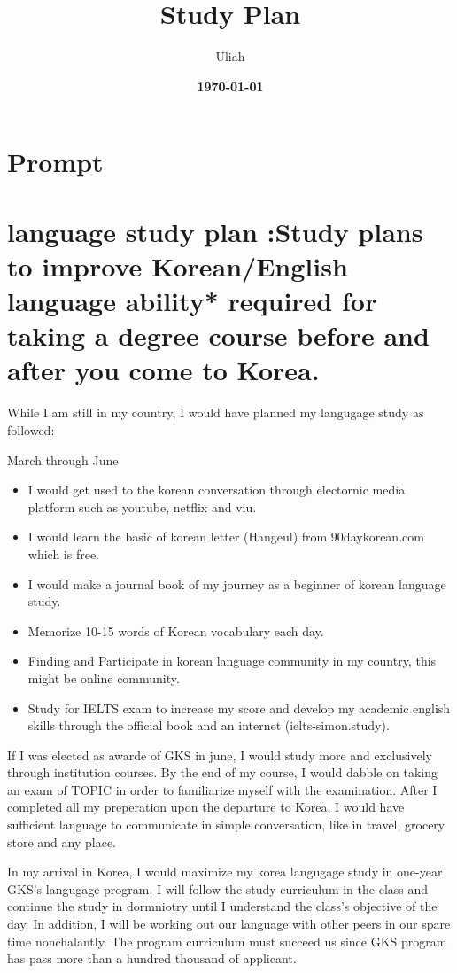 \documentclass[12pt]{simart} %
\title{
\textbf{ Study Plan} \\
} %
\date{\textbf{\today}}
\author{Uliah}
\begin{document}
\maketitle
\section{Prompt}

\section{language study plan :Study plans to improve Korean/English language ability* required for taking a degree course before and after you come to Korea.}

While I am still in my country, I would have planned my langugage study as followed:

March through June
\begin{itemize}
    \item I would get used to the korean conversation through electornic media platform such as youtube, netflix and viu.
    \item I would learn the basic of korean letter (Hangeul) from 90daykorean.com which is free.
    \item I would make a journal book of my journey as a beginner of korean language study.
    \item Memorize 10-15 words of Korean vocabulary each day.
    \item Finding and Participate in korean language community in my country, this might be online community.
    \item Study for IELTS exam to increase my score and develop my academic english skills through the official book and an internet (ielts-simon.study).
\end{itemize}

If I was elected as awarde of GKS in june, I would study more and exclusively through institution courses. By the end of my course, I would dabble on taking an exam of TOPIC in order to familiarize myself with the examination. After I completed all my preperation  upon the departure to Korea, I would have sufficient language to communicate in simple conversation, like in travel, grocery store and any place.

In my arrival in Korea, I would maximize my korea langugage study in one-year GKS's langugage program.
I will follow the study curriculum in the class and continue the study in dormniotry until I understand the class's objective of the day.
In addition, I will be working out our language with other peers in our spare time nonchalantly.
The program curriculum must succeed us since GKS program has pass more than a hundred thousand of applicant.
\end{document}
